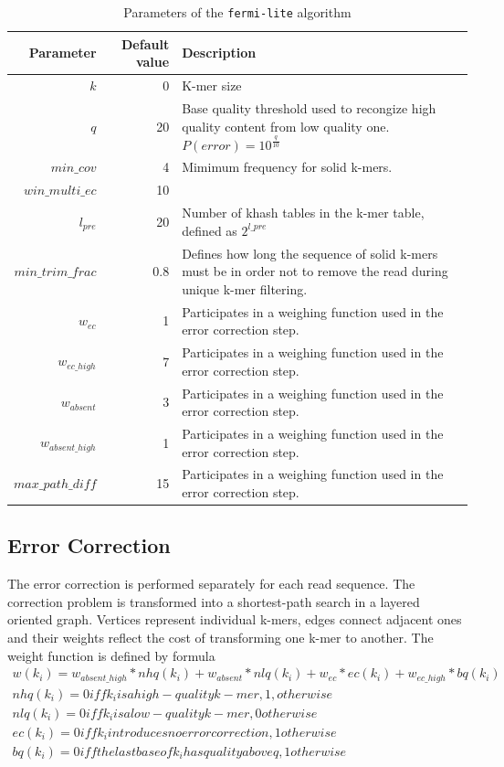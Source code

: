 \begin{table}[h]
\begin{center}
\caption{Parameters of the \texttt{fermi-lite} algorithm}
\label{tab:fermi-parameters}
\begin{tabular}{| r | r | p{5cm} |}
\hline
Parameter & Default value & Description \\
\hline
$k$ & 0 & K-mer size \\
\hline
$q$ & 20 & Base quality threshold used to recongize high quality content from low quality one. $P(error) = 10^{\frac{q}{10}}$ \\
\hline
$min\_cov$ & 4 & Mimimum frequency for solid k-mers. \\
\hline
$win\_multi\_ec$ & 10 &  \\
\hline
$l_{pre}$ & 20 & Number of khash tables in the k-mer table, defined as $2^{l\_pre}$ \\
\hline
$min\_trim\_frac$ & 0.8 &  Defines how long the sequence of solid k-mers must be in order not to remove the read during unique k-mer filtering. \\
\hline
$w_{ec}$ & 1 & Participates in a weighing function used in the error correction step.\\
\hline
$w_{ec\_high}$ & 7 & Participates in a weighing function used in the error correction step. \\
\hline
$w_{absent}$ & 3 & Participates in a weighing function used in the error correction step. \\
\hline
$w_{absent\_high}$ & 1 & Participates in a weighing function used in the error correction step. \\ 
\hline
$max\_path\_diff$ & 15 & Participates in a weighing function used in the error correction step. \\ 
\hline
\end{tabular}
\end{center}
\end{table}

\subsection{Error Correction}
\label{subsec:fermi-error-correction}

The error correction is performed separately for each read sequence. The correction problem is transformed into a shortest-path search in a layered oriented graph. Vertices represent individual k-mers, edges connect adjacent ones and their weights reflect the cost of transforming one k-mer to another. The weight function is defined by formula
\begin{gather}
	w(k_i) = w_{absent\_high}*nhq(k_i) + w_{absent}*nlq(k_i) + w_{ec}*ec(k_i) + w_{ec\_high}*bq(k_i) \\
	nhq(k_i) = 0 iff k_i is a high-quality k-mer, 1, otherwise \\
	nlq(k_i) = 0 iff k_i is a low-quality k-mer, 0 otherwise \\
	ec(k_i) = 0 iff k_i introduces no error correction, 1 otherwise \\
	bq(k_i) = 0 iff the last base of k_i has quality above q, 1 otherwise
\end{gather}

